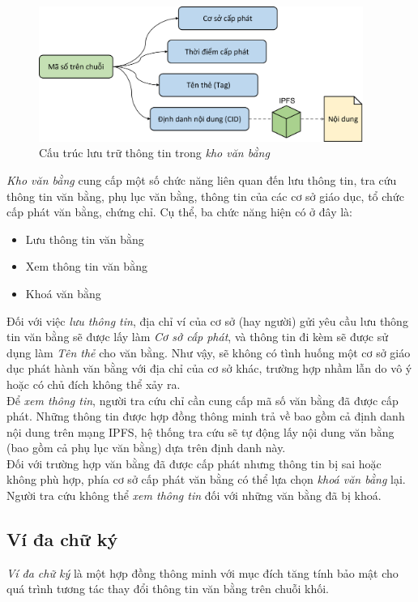 \begin{figure}[!ht]
    \centering
    \includegraphics[width=400px]{anh/giai-phap/cau-truc-du-lieu.png}
    \caption{Cấu trúc lưu trữ thông tin trong \textit{kho văn bằng}}
\end{figure}

\textit{Kho văn bằng} cung cấp một số chức năng liên quan đến lưu thông tin, tra cứu thông tin văn bằng, phụ lục văn bằng, thông tin của các cơ sở giáo dục, tổ chức cấp phát văn bằng, chứng chỉ. Cụ thể, ba chức năng hiện có ở đây là:
\begin{itemize}
    \item Lưu thông tin văn bằng
    \item Xem thông tin văn bằng
    \item Khoá văn bằng
\end{itemize}

Đối với việc \textit{lưu thông tin}, địa chỉ ví của cơ sở (hay người) gửi yêu cầu lưu thông tin văn bằng sẽ được lấy làm \textit{Cơ sở cấp phát}, và thông tin đi kèm sẽ được sử dụng làm \textit{Tên thẻ} cho văn bằng. Như vậy, sẽ không có tình huống một cơ sở giáo dục phát hành văn bằng với địa chỉ của cơ sở khác, trường hợp nhầm lẫn do vô ý hoặc có chủ đích không thể xảy ra.\\

Để \textit{xem thông tin}, người tra cứu chỉ cần cung cấp mã số văn bằng đã được cấp phát. Những thông tin được hợp đồng thông minh trả về bao gồm cả định danh nội dung trên mạng IPFS, hệ thống tra cứu sẽ tự động lấy nội dung văn bằng (bao gồm cả phụ lục văn bằng) dựa trên định danh này.\\

Đối với trường hợp văn bằng đã được cấp phát nhưng thông tin bị sai hoặc không phù hợp, phía cơ sở cấp phát văn bằng có thể lựa chọn \textit{khoá văn bằng} lại. Người tra cứu không thể \textit{xem thông tin} đối với những văn bằng đã bị khoá.


\subsection{Ví đa chữ ký}
\textit{Ví đa chữ ký} là một hợp đồng thông minh với mục đích tăng tính bảo mật cho quá trình tương tác thay đổi thông tin văn bằng trên chuỗi khối.\\

